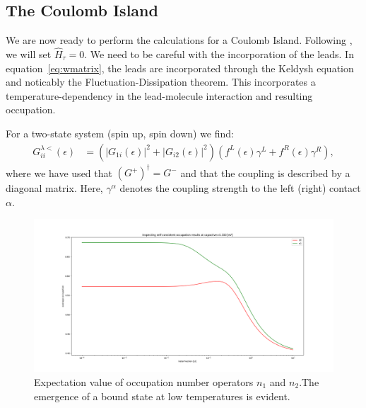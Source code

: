 \documentclass{article}
\begin{document}
\begin{multicols}{2}

    \section{The Coulomb Island}\label{sec:island}
        We are now ready to perform the calculations for a Coulomb Island. Following \citet{haugjauho}, we will set $\hat{H}_\tau = 0$. We need to be careful with the incorporation of the leads. In equation~\ref{eq:wmatrix}, the leads are incorporated through the Keldysh equation and noticably the Fluctuation-Dissipation theorem. This incorporates a temperature-dependency in the lead-molecule interaction and resulting occupation.
        
        For a two-state system (spin up, spin down) we find:
        \begin{align*}
            G^{\lambda<}_{ii}(\epsilon) &= \left(\left|G_{1i}(\epsilon)\right|^2 + \left|G_{i2}(\epsilon)\right|^2 \right)\left(f^L (\epsilon) \gamma^L+f^R (\epsilon) \gamma^R\right),
        \end{align*}
        where we have used that $(G^+)^\dagger=G^-$ and that the coupling is described by a diagonal matrix. Here, $\gamma^\alpha$ denotes the coupling strength to the left (right) contact $\alpha$.
        
        \begin{figure}[b]
            \centering
            \includegraphics[width=\textwidth]{fig/figure_1.png}
            \caption{\label{fig:numberoperators}Expectation value of occupation number operators $n_1$ and $n_2$.The emergence of a bound state at low temperatures is evident.}
        \end{figure}
          

\end{multicols}
\end{document}
